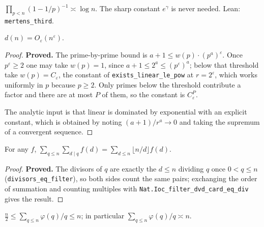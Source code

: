 \begin{lemma}
  \label{lem:mertens-three}
  \notready
  $\prod_{p < n} (1 - 1/p)^{-1} \asymp \log n$. The sharp constant $e^{\gamma}$ is
  never needed. Lean: \texttt{mertens\_third}.
\end{lemma}

\begin{lemma}
  \label{lem:divisor-bound}
  \leanok
  $d(n) = O_{\varepsilon}(n^{\varepsilon})$.
\end{lemma}

\begin{proof}
  \leanok
  \textbf{Proved.} The prime-by-prime bound is
  $a + 1 \leq w(p) \cdot (p^a)^{\varepsilon}$. Once $p^{\varepsilon} \geq 2$ one may take
  $w(p) = 1$, since $a + 1 \leq 2^a \leq (p^{\varepsilon})^a$; below that threshold take
  $w(p) = C_{\varepsilon}$, the constant of \texttt{exists\_linear\_le\_pow} at
  $r = 2^{\varepsilon}$, which works uniformly in $p$ because $p \geq 2$. Only primes
  below the threshold contribute a factor and there are at most $P$ of them, so the
  constant is $C_{\varepsilon}^{P}$.

  The analytic input is that linear is dominated by exponential with an explicit
  constant, which is obtained by noting $(a+1)/r^a \to 0$ and taking the supremum of a
  convergent sequence.
\end{proof}

\begin{lemma}
  \label{lem:dirichlet-swap}
  \leanok
  For any $f$, $\sum_{q \leq n} \sum_{d \mid q} f(d) = \sum_{d \leq n} \lfloor n/d \rfloor f(d)$.
\end{lemma}

\begin{proof}
  \leanok
  \textbf{Proved.} The divisors of $q$ are exactly the $d \leq n$ dividing $q$ once
  $0 < q \leq n$ (\texttt{divisors\_eq\_filter}), so both sides count the same pairs;
  exchanging the order of summation and counting multiples with
  \texttt{Nat.Ioc\_filter\_dvd\_card\_eq\_div} gives the result.
\end{proof}

\begin{lemma}
  \label{lem:totient-average}
  \leanok
  $\tfrac{n}{2} \leq \sum_{q \leq n} \varphi(q)/q \leq n$; in particular
  $\sum_{q \leq n} \varphi(q)/q \asymp n$.
\end{lemma}

